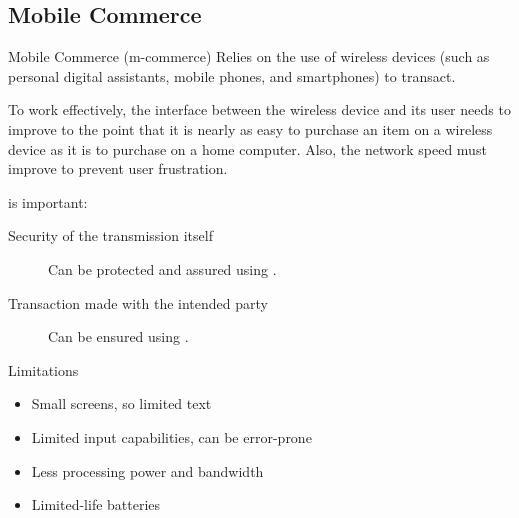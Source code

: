 \documentclass[\main/notes.tex]{subfiles}
\begin{document}
			\subsection{Mobile Commerce}
				\begin{definition}{Mobile Commerce (m-commerce)}
					Relies on the use of wireless devices (such as personal digital assistants, mobile phones, and smartphones) to transact.

					To work effectively, the interface between the wireless device and its user needs to improve to the point that it is nearly as easy to purchase an item on a wireless device as it is to purchase on a home computer. Also, the network speed must improve to prevent user frustration.

					 is important:
					\begin{indentparagraph}
						\begin{description}
							\item[Security of the transmission itself] Can be protected and assured using .
							\item[Transaction made with the intended party] Can be ensured using .
						\end{description}
					\end{indentparagraph}
				\end{definition}
				\begin{sidenote}{Limitations}
					\begin{itemize}[nosep]
						\item Small screens, so limited text
						\item Limited input capabilities, can be error-prone
						\item Less processing power and bandwidth
						\item Limited-life batteries
					\end{itemize}
				\end{sidenote}
\end{document}

